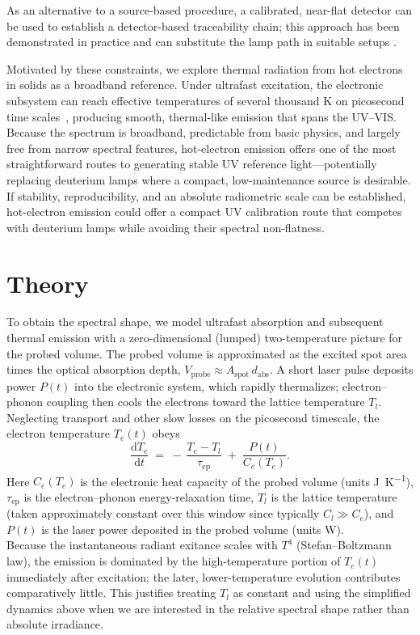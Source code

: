 \documentclass[
	parskip=half,
	a4paper,
]{scrarticle}
\begin{document}
As an alternative to a source-based procedure, a calibrated, near-flat detector can be used to establish a detector-based traceability chain; this approach has been demonstrated in practice and can substitute the lamp path in suitable setups \cite{larason_nist_1996}.

Motivated by these constraints, we explore thermal radiation from hot electrons in solids as a broadband reference. Under ultrafast excitation, the electronic subsystem can reach effective temperatures of several thousand \si{\kelvin} on picosecond time scales~\cite{lui_ultrafast_2010}, producing smooth, thermal-like emission that spans the UV–VIS. Because the spectrum is broadband, predictable from basic physics, and largely free from narrow spectral features, hot-electron emission offers one of the most straightforward routes to generating stable UV reference light—potentially replacing deuterium lamps where a compact, low-maintenance source is desirable. If stability, reproducibility, and an absolute radiometric scale can be established, hot-electron emission could offer a compact UV calibration route that competes with deuterium lamps while avoiding their spectral non-flatness.

\section{Theory}
To obtain the spectral shape, we model ultrafast absorption and subsequent thermal emission with a zero-dimensional (lumped) two-temperature picture for the probed volume. The probed volume is approximated as the excited spot area times the optical absorption depth, \(V_{\text{probe}} \approx A_{\text{spot}}\,d_{\text{abs}}\). A short laser pulse deposits power \(P(t)\) into the electronic system, which rapidly thermalizes; electron–phonon coupling then cools the electrons toward the lattice temperature \(T_l\). Neglecting transport and other slow losses on the picosecond timescale, the electron temperature \(T_e(t)\) obeys
\begin{equation}
    \frac{\mathrm d T_e}{\mathrm d t}
    \;=\;
    -\,\frac{T_e - T_l}{\tau_{\mathrm{ep}}}
    \;+\;
    \frac{P(t)}{C_e(T_e)}.
    \label{eq:Te}
\end{equation}
Here \(C_e(T_e)\) is the electronic heat capacity of the probed volume (units \si{J\per K}), \(\tau_{\mathrm{ep}}\) is the electron–phonon energy-relaxation time, \(T_l\) is the lattice temperature (taken approximately constant over this window since typically \(C_l \gg C_e\)), and \(P(t)\) is the laser power deposited in the probed volume (units \si{W}).\\
Because the instantaneous radiant exitance scales with \(T^4\) (Stefan–Boltzmann law), the emission is dominated by the high-temperature portion of \(T_e(t)\) immediately after excitation; the later, lower-temperature evolution contributes comparatively little. This justifies treating \(T_l\) as constant and using the simplified dynamics above when we are interested in the relative spectral shape rather than absolute irradiance.
\end{document}
